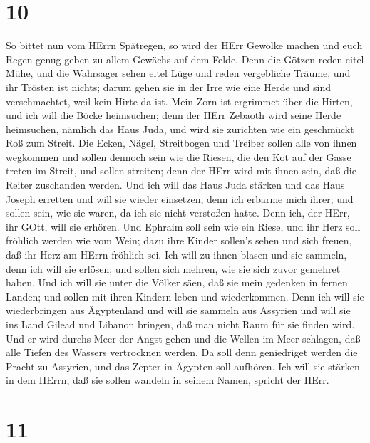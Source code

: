 \hypertarget{section-9}{%
\section{10}\label{section-9}}

 So bittet nun vom HErrn Spätregen, so wird der HErr Gewölke
machen und euch Regen genug geben zu allem Gewächs auf dem Felde.
 Denn die Götzen reden eitel Mühe, und die Wahrsager sehen
eitel Lüge und reden vergebliche Träume, und ihr Trösten ist nichts;
darum gehen sie in der Irre wie eine Herde und sind verschmachtet, weil
kein Hirte da ist.  Mein Zorn ist ergrimmet über die Hirten,
und ich will die Böcke heimsuchen; denn der HErr Zebaoth wird seine
Herde heimsuchen, nämlich das Haus Juda, und wird sie zurichten wie ein
geschmückt Roß zum Streit.  Die Ecken, Nägel, Streitbogen
und Treiber sollen alle von ihnen wegkommen  und sollen
dennoch sein wie die Riesen, die den Kot auf der Gasse treten im Streit,
und sollen streiten; denn der HErr wird mit ihnen sein, daß die Reiter
zuschanden werden.  Und ich will das Haus Juda stärken und
das Haus Joseph erretten und will sie wieder einsetzen, denn ich erbarme
mich ihrer; und sollen sein, wie sie waren, da ich sie nicht verstoßen
hatte. Denn ich, der HErr, ihr GOtt, will sie erhören.  Und
Ephraim soll sein wie ein Riese, und ihr Herz soll fröhlich werden wie
vom Wein; dazu ihre Kinder sollen's sehen und sich freuen, daß ihr Herz
am HErrn fröhlich sei.  Ich will zu ihnen blasen und sie
sammeln, denn ich will sie erlösen; und sollen sich mehren, wie sie sich
zuvor gemehret haben.  Und ich will sie unter die Völker
säen, daß sie mein gedenken in fernen Landen; und sollen mit ihren
Kindern leben und wiederkommen.  Denn ich will sie
wiederbringen aus Ägyptenland und will sie sammeln aus Assyrien und will
sie ins Land Gilead und Libanon bringen, daß man nicht Raum für sie
finden wird.  Und er wird durchs Meer der Angst gehen und
die Wellen im Meer schlagen, daß alle Tiefen des Wassers vertrocknen
werden. Da soll denn geniedriget werden die Pracht zu Assyrien, und das
Zepter in Ägypten soll aufhören.  Ich will sie stärken in
dem HErrn, daß sie sollen wandeln in seinem Namen, spricht der HErr.

\hypertarget{section-10}{%
\section{11}\label{section-10}}

